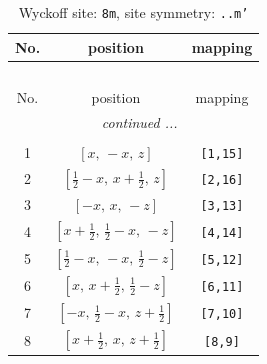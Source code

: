 \documentclass[fleqn,8pt]{jsarticle}
\begin{document}
\begin{longtable}{ccc}
\caption{Wyckoff site: {\tt 8m}, site symmetry: {\tt ..m'}}
 \\
 \hline \hline
No. & position & mapping \\ \hline \endfirsthead

\multicolumn{2}{l}{\tablename\ \thetable{}} \\
 \hline \hline
No. & position & mapping \\ \hline \endhead

 \hline \hline
\multicolumn{2}{r}{\footnotesize\it continued ...} \\ \endfoot

 \hline \hline
\multicolumn{2}{r}{} \\ \endlastfoot

1 & $\left[ x,\, - x,\, z \right]$ & {\tt [1,15]} \\ \hline
2 & $\left[ \frac{1}{2} - x,\, x + \frac{1}{2},\, z \right]$ & {\tt [2,16]} \\ \hline
3 & $\left[ - x,\, x,\, - z \right]$ & {\tt [3,13]} \\ \hline
4 & $\left[ x + \frac{1}{2},\, \frac{1}{2} - x,\, - z \right]$ & {\tt [4,14]} \\ \hline
5 & $\left[ \frac{1}{2} - x,\, - x,\, \frac{1}{2} - z \right]$ & {\tt [5,12]} \\ \hline
6 & $\left[ x,\, x + \frac{1}{2},\, \frac{1}{2} - z \right]$ & {\tt [6,11]} \\ \hline
7 & $\left[ - x,\, \frac{1}{2} - x,\, z + \frac{1}{2} \right]$ & {\tt [7,10]} \\ \hline
8 & $\left[ x + \frac{1}{2},\, x,\, z + \frac{1}{2} \right]$ & {\tt [8,9]} \\
\end{longtable}
\renewcommand{\arraystretch}{1.2}
\end{document}

